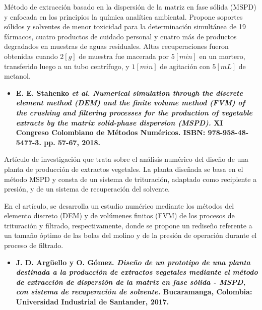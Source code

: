 \noindent
\justify

M\'etodo de extracci\'on basado en la dispersi\'on de la matriz en fase s\'olida (MSPD) y enfocada en los principios la qu\'imica anal\'itica ambiental. Propone soportes s\'olidos y solventes de menor toxicidad para la determinaci\'on simult\'anea de 19 f\'armacos, cuatro productos de cuidado personal y cuatro m\'as de productos degradados en muestras de aguas residuales. Altas recuperaciones fueron obtenidas cuando $2 [g]$ de muestra fue macerada por $5 [min]$ en un mortero, transferido luego a un tubo centr\'ifugo, y $1 [min]$ de agitaci\'on con $5 [mL]$ de metanol. 

\begin{itemize}
	\item{\textbf{E. E. Stahenko \textit{et al. Numerical simulation through the discrete element method (DEM) and the finite volume method (FVM) of the crushing and filtering processes for the production of vegetable extracts by the matrix solid-phase dispersion (MSPD).} XI Congreso Colombiano de M\'etodos Num\'ericos. ISBN: 978-958-48-5477-3. pp. 57-67, 2018.}}
\end{itemize}

\noindent
\justify

Art\'iculo de investigaci\'on que trata sobre el an\'alisis num\'erico del dise\~no de una planta de producci\'on de extractos vegetales. La planta dise\~nada se basa en el m\'etodo MSPD y consta de un sistema de trituraci\'on, adaptado como recipiente a presi\'on, y de un sistema de recuperaci\'on del solvente. 

\noindent
\justify

En el art\'iculo, se desarrolla un estudio num\'erico mediante los m\'etodos del elemento discreto (DEM) y de vol\'umenes finitos (FVM) de los procesos de trituraci\'on y filtrado, respectivamente, donde se propone un redise\~no referente a un tama\~no \'optimo de las bolas del molino y de la presi\'on de operaci\'on durante el proceso de filtrado.

\begin{itemize}
	\item{\textbf{J. D. Arg\"uello y O. G\'omez. \textit{Dise\~no de un prototipo de una planta destinada a la producci\'on de extractos vegetales mediante el m\'etodo de extracci\'on de dispersi\'on de la matriz en fase s\'olida - MSPD, con sistema de recuperaci\'on de solvente.} Bucaramanga, Colombia: Universidad Industrial de Santander, 2017.}}
\end{itemize}

